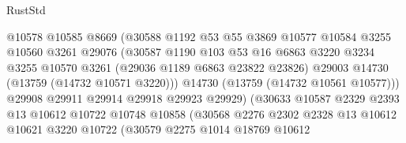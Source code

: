 \begin{lexlean}{RustStd}
\begin{coremodule}
                                  @10578
                                  @10585
                                  @8669
                                  (@30588
                                    @1192
                                    @53
                                    @55
                                    @3869
                                    @10577
                                    @10584
                                    @3255
                                    @10560
                                    @3261
                                    @29076
                                    (@30587
                                      @1190
                                      @103
                                      @53
                                      @16
                                      @6863
                                      @3220
                                      @3234
                                      @3255
                                      @10570
                                      @3261
                                      (@29036 @1189 @6863 @23822 @23826)
                                      @29003
                                      @14730
                                      (@13759 (@14732 @10571 @3220)))
                                    @14730
                                    (@13759 (@14732 @10561 @10577)))
                                  @29908
                                  @29911
                                  @29914
                                  @29918
                                  @29923
                                  @29929)
                                (@30633
                                  @10587
                                  @2329
                                  @2393
                                  @13
                                  @10612
                                  @10722
                                  @10748
                                  @10858
                                  (@30568
                                    @2276
                                    @2302
                                    @2328
                                    @13
                                    @10612
                                    @10621
                                    @3220
                                    @10722
                                    (@30579
                                      @2275
                                      @1014
                                      @18769
                                      @10612

\end{coremodule}
\end{lexlean}
